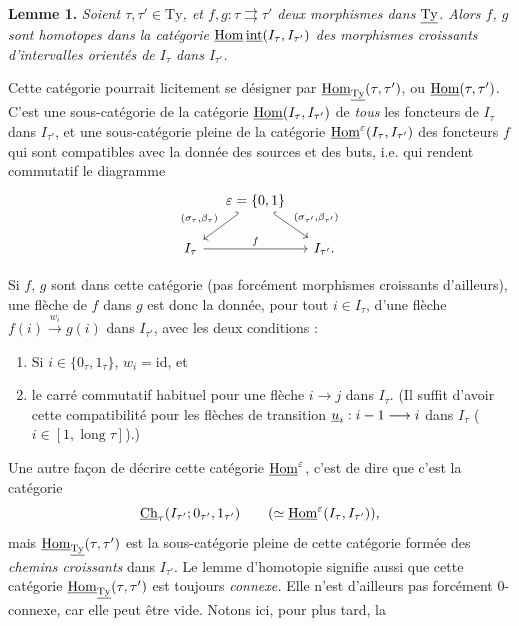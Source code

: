 \textbf{Lemme 1.} \textit{Soient $\tau,\tau'\in\mathrm{Ty}$, et $f,g:\tau\rightrightarrows\tau'$ deux morphismes dans $\underline{\mathrm{Ty}}$. Alors $f$, $g$ sont homotopes dans la catégorie $\underline{\mathrm{Hom}}\,\underline{\mathrm{int}}(I_\tau,I_{\tau'})$ des morphismes croissants d'intervalles orientés de $I_\tau$ dans $I_{\tau'}$.}

Cette catégorie pourrait licitement se désigner par $\underline{\mathrm{Hom}}_{\underline{\mathrm{Ty}}}(\tau,\tau')$, ou $\underline{\mathrm{Hom}}(\tau,\tau')$. C'est une sous-catégorie de la catégorie $\underline{\mathrm{Hom}}(I_\tau,I_{\tau'})$ de \textit{tous} les foncteurs de $I_\tau$ dans $I_{\tau'}$, et une sous-catégorie pleine de la catégorie $\underline{\mathrm{Hom}}^\varepsilon(I_\tau,I_{\tau'})$ des foncteurs $f$ qui sont compatibles avec la donnée des sources et des buts, i.e. qui rendent commutatif le diagramme
\[
\begin{tikzcd}[column sep=small]
 & \varepsilon=\{0,1\} \arrow[dl, hook', "{(\sigma_\tau,\beta_\tau)}"'] \arrow[dr, hook, "{(\sigma_{\tau'},\beta_{\tau'})}"] & \\
I_\tau \arrow[rr, "f"] & & I_{\tau'}.
\end{tikzcd}
\]

Si $f$, $g$ sont dans cette catégorie (pas forcément morphismes croissants d'ailleurs), une flèche de $f$ dans $g$ est donc la donnée, pour tout $i\in I_\tau$, d'une flèche $f(i)\xrightarrow{w_i}g(i)$ dans $I_{\tau'}$, avec les deux conditions :

\begin{enumerate}[label={}, leftmargin=*]
\item[a)] Si $i\in\{0_\tau,1_\tau\}$, $w_i=\mathrm{id}$, et
\item[b)] le carré commutatif habituel pour une flèche $i\longrightarrow j$ dans $I_\tau$. (Il suffit d'avoir cette compatibilité pour les flèches de transition $\underline{u}_i:i-1\longrightarrow i$ dans $I_\tau$ ($i\in[1,\operatorname{long}\tau]$).)
\end{enumerate}

Une autre façon de décrire cette catégorie $\underline{\mathrm{Hom}}^\varepsilon$, c'est de dire que c'est la catégorie
\[
\underline{\mathrm{Ch}}_\tau(I_{\tau'};0_{\tau'},1_{\tau'})\qquad(\simeq\underline{\mathrm{Hom}}^\varepsilon(I_\tau,I_{\tau'})),
\]
mais $\underline{\mathrm{Hom}}_{\underline{\mathrm{Ty}}}(\tau,\tau')$ est la sous-catégorie pleine de cette catégorie formée des \textit{chemins croissants} dans $I_{\tau'}$. Le lemme d'homotopie signifie aussi que cette catégorie $\underline{\mathrm{Hom}}_{\underline{\mathrm{Ty}}}(\tau,\tau')$ est toujours \textit{connexe.} Elle n'est d'ailleurs pas forcément 0-connexe, car elle peut être vide. Notons ici, pour plus tard, la

